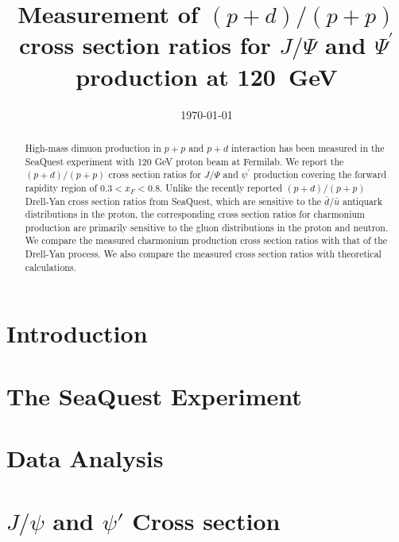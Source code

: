\documentclass[twocolumn,aps,unsortedaddress,superscriptaddress,prd,floatfix,showpacs,linenumbers]{revtex4-2}
\begin{document}
\title{Measurement of $(p+d) / (p+p)$ cross section ratios for
$J/\Psi$ and $\Psi^\prime$ production at \SI{120}{\GeV}}


\date{\today}
\begin{abstract}
High-mass dimuon production in $p+p$ and $p+d$ interaction has been measured
in the SeaQuest experiment with 120 GeV proton beam at Fermilab.
We report the $(p+d) / (p+p)$ cross section
ratios for $J/\Psi$ and $\psi^\prime$ production covering the forward
rapidity region of $0.3 < x_F <0.8$. Unlike the recently reported
$(p+d) / (p+p)$ Drell-Yan cross section ratios from SeaQuest, which are
sensitive to the
$\bar d / \bar u$ antiquark distributions in the proton, the corresponding
cross section ratios for charmonium production are primarily
sensitive to the gluon
distributions in the proton and neutron. We compare the measured
charmonium production cross section ratios with that of the
Drell-Yan process. We also compare the measured cross section ratios with
theoretical calculations.

\end{abstract}


\maketitle
\section{Introduction}

\section{The SeaQuest Experiment}

\section{Data Analysis}

\section{$J/\psi$ and $\psi'$ Cross section}

\nocite{*}

\end{document}
